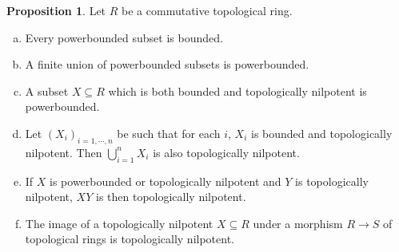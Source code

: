 \documentclass[10pt]{article}
\numberwithin{equation}{section}
\theoremstyle{definition}
\newtheorem{proposition}{Proposition}[subsection]
\begin{document}
\begin{proposition}
    \label{fact_11_5}
    Let $R$ be a commutative topological ring.
    \begin{enumerate}[a.]
        \item Every powerbounded subset is bounded.
        \item A finite union of powerbounded subsets is powerbounded.
        \item A subset $X\subseteq R$ which is both bounded and topologically nilpotent is powerbounded.
        \item Let $(X_i)_{i=1,\cdots,n}$ be such that for each $i$, $X_i$ is bounded and topologically nilpotent. Then $\bigcup_{i=1}^nX_i$ is also topologically nilpotent.
        \item If $X$ is powerbounded or topologically nilpotent and $Y$ is topologically nilpotent, $XY$ is then topologically nilpotent.
        \item The image of a topologically nilpotent $X\subseteq R$ under a morphism $R\to S$ of topological rings is topologically nilpotent.
    \end{enumerate}
\end{proposition}
\end{document}

